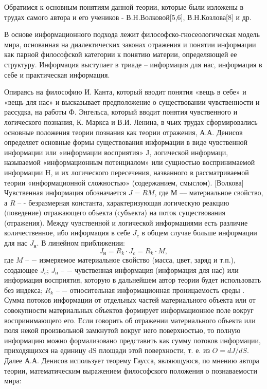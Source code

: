 \documentclass[a4paper,12pt]{report}
\begin{document}
	Обратимся к основным понятиям данной теории, которые были изложены в трудах самого автора и его учеников - В.Н.Волковой[5,6], В.Н.Козлова[8] и др.
	
	В основе информационного подхода лежит философско-гносеологическая модель мира, основанная на диалектических законах отражения и понятии информации как парной философской категории к понятию материи, определяющей ее структуру. Информация выступает в триаде – информация для нас, информация в себе и практическая информация.
	
Опираясь на философию И. Канта, который вводит понятия «вещь в себе» и «вещь для нас» и высказывает предположение о существовании чувственности и рассудка, на работы Ф. Энгельса, который вводит понятия чувственного и логического познания, К. Маркса и В.И. Ленина, в чьих трудах сформировались основные положения теории познания как теории отражения, А.А. Денисов определяет основные формы существования информации в виде чувственной информации или «информации восприятия» J, логической информаци, называемой «информационным потенциалом» или сущностью воспринимаемой информации H, и их логического пересечения, названного в рассматриваемой теории «информационной сложностью» (содержанием, смыслом). [Волкова] Чувственная информация обозначается $J = RM$, где $М \mbox{ –}$– материальное свойство, а $R \mbox{ –}$ - безразмерная константа, характеризующая логическую реакцию (поведение) отражающего объекта (субъекта) на поток существования (отражения). Между чувственной и логической информациями есть различие количественное, ибо информация в себе $J_c$ в общем случае больше информации для нас $J_н$. В линейном приближении: \\
\begin{equation}
\label{trivial}
	 J_н = R_k \cdot J_c  = R_k \cdot M,                                          				          
\end{equation}
где $M \mbox{ –} $ − измеряемое материальное свойство (масса, цвет, заряд и т.п.), создающее $J_c$; $J_н \mbox{ –}$ − чувственная информация (информация для нас) или информация восприятия, которую в дальнейшем автор теории будет использовать без индекса; $R_k \mbox{ –}$ − относительная информационная проницаемость среды .\\

	Сумма потоков информации от отдельных частей материального объекта или от совокупности материальных объектов формирует информационное поле вокруг воспринимающего его. Если говорить об отражении материального объекта или поля некой произвольной замкнутой вокруг него поверхностью, то полную информацию можно формализовано представить как сумму потоков информации, приходящихся на единицу dS площади этой поверхности, т. е. из $O = dJ/dS$. Далее А.А. Денисов использует теорему Гаусса, являющуюся, по мнению автора теории, математическим выражением философского положения о познаваемости мира:
\end{document}
